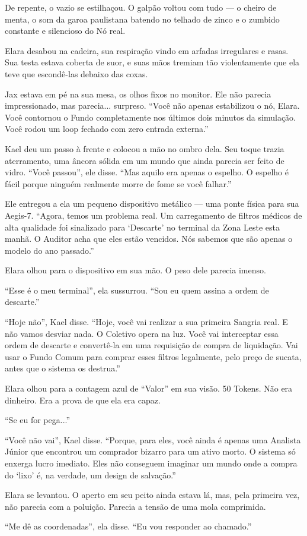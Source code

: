 De repente, o vazio se estilhaçou. O galpão voltou com tudo --- o cheiro de menta, o som da garoa paulistana batendo no telhado de zinco e o zumbido constante e silencioso do Nó real.

Elara desabou na cadeira, sua respiração vindo em arfadas irregulares e rasas. Sua testa estava coberta de suor, e suas mãos tremiam tão violentamente que ela teve que escondê-las debaixo das coxas.


Jax estava em pé na sua mesa, os olhos fixos no monitor. Ele não parecia impressionado, mas parecia... surpreso. ``Você não apenas estabilizou o nó, Elara. Você contornou o Fundo completamente nos últimos dois minutos da simulação. Você rodou um loop fechado com zero entrada externa.''

Kael deu um passo à frente e colocou a mão no ombro dela. Seu toque trazia aterramento, uma âncora sólida em um mundo que ainda parecia ser feito de vidro. ``Você passou'', ele disse. ``Mas aquilo era apenas o espelho. O espelho é fácil porque ninguém realmente morre de fome se você falhar.''

Ele entregou a ela um pequeno dispositivo metálico --- uma ponte física para sua Aegis-7. ``Agora, temos um problema real. Um carregamento de filtros médicos de alta qualidade foi sinalizado para `Descarte' no terminal da Zona Leste esta manhã. O Auditor acha que eles estão vencidos. Nós sabemos que são apenas o modelo do ano passado.''

Elara olhou para o dispositivo em sua mão. O peso dele parecia imenso.

``Esse é o meu terminal'', ela sussurrou. ``Sou eu quem assina a ordem de descarte.''

``Hoje não'', Kael disse. ``Hoje, você vai realizar a sua primeira Sangria real. E não vamos desviar nada. O Coletivo opera na luz. Você vai interceptar essa ordem de descarte e convertê-la em uma requisição de compra de liquidação. Vai usar o Fundo Comum para comprar esses filtros legalmente, pelo preço de sucata, antes que o sistema os destrua.''

Elara olhou para a contagem azul de ``Valor'' em sua visão. 50 Tokens. Não era dinheiro. Era a prova de que ela era capaz.

``Se eu for pega...''

``Você não vai'', Kael disse. ``Porque, para eles, você ainda é apenas uma Analista Júnior que encontrou um comprador bizarro para um ativo morto. O sistema só enxerga lucro imediato. Eles não conseguem imaginar um mundo onde a compra do `lixo' é, na verdade, um design de salvação.''

Elara se levantou. O aperto em seu peito ainda estava lá, mas, pela primeira vez, não parecia com a poluição. Parecia a tensão de uma mola comprimida.

``Me dê as coordenadas'', ela disse. ``Eu vou responder ao chamado.''

